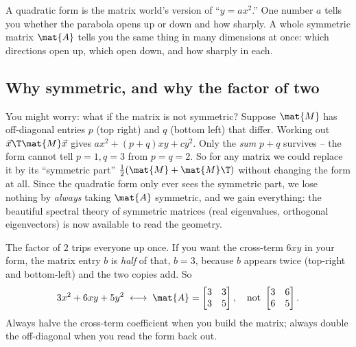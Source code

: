 \begin{focusbox}
A quadratic form is the matrix world's version of ``$y = a x^2$.'' One number $a$
tells you whether the parabola opens up or down and how sharply. A whole symmetric
matrix $\mat{A}$ tells you the same thing in many dimensions at once: which
directions open up, which open down, and how sharply in each.
\end{focusbox}

\subsection{Why symmetric, and why the factor of two}

You might worry: what if the matrix is not symmetric? Suppose $\mat{M}$ has
off-diagonal entries $p$ (top right) and $q$ (bottom left) that differ. Working out
$\vec{x}\T\mat{M}\vec{x}$ gives $a x^2 + (p+q)xy + c y^2$. Only the \emph{sum} $p+q$
survives -- the form cannot tell $p=1,q=3$ from $p=q=2$. So for any matrix we could
replace it by its ``symmetric part'' $\tfrac12(\mat{M}+\mat{M}\T)$ without changing
the form at all. Since the quadratic form only ever sees the symmetric part, we lose
nothing by \emph{always} taking $\mat{A}$ symmetric, and we gain everything: the
beautiful spectral theory of symmetric matrices (real eigenvalues, orthogonal
eigenvectors) is now available to read the geometry.

\begin{trapbox}
The factor of $2$ trips everyone up once. If you want the cross-term $6xy$ in your
form, the matrix entry $b$ is \emph{half} of that, $b=3$, because $b$ appears twice
(top-right and bottom-left) and the two copies add. So
\[
  3x^2 + 6xy + 5y^2 \;\longleftrightarrow\; \mat{A}=\begin{bmatrix}3 & 3\\ 3 & 5\end{bmatrix},
  \quad\text{not } \begin{bmatrix}3&6\\6&5\end{bmatrix}.
\]
Always halve the cross-term coefficient when you build the matrix; always double the
off-diagonal when you read the form back out.
\end{trapbox}

